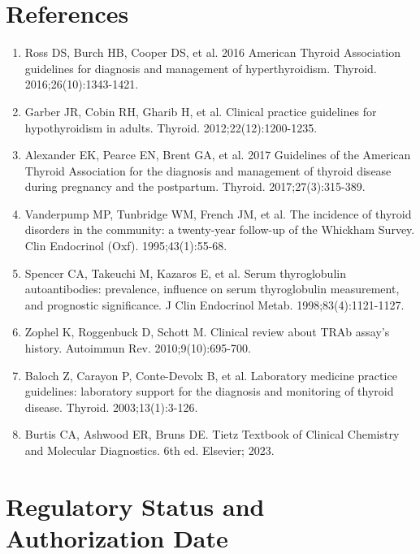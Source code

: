 \section*{References}
\begin{enumerate}
  \item Ross DS, Burch HB, Cooper DS, et al. 2016 American Thyroid Association guidelines for diagnosis and management of hyperthyroidism. Thyroid. 2016;26(10):1343-1421.
  \item Garber JR, Cobin RH, Gharib H, et al. Clinical practice guidelines for hypothyroidism in adults. Thyroid. 2012;22(12):1200-1235.
  \item Alexander EK, Pearce EN, Brent GA, et al. 2017 Guidelines of the American Thyroid Association for the diagnosis and management of thyroid disease during pregnancy and the postpartum. Thyroid. 2017;27(3):315-389.
  \item Vanderpump MP, Tunbridge WM, French JM, et al. The incidence of thyroid disorders in the community: a twenty-year follow-up of the Whickham Survey. Clin Endocrinol (Oxf). 1995;43(1):55-68.
  \item Spencer CA, Takeuchi M, Kazaros E, et al. Serum thyroglobulin autoantibodies: prevalence, influence on serum thyroglobulin measurement, and prognostic significance. J Clin Endocrinol Metab. 1998;83(4):1121-1127.
  \item Zophel K, Roggenbuck D, Schott M. Clinical review about TRAb assay's history. Autoimmun Rev. 2010;9(10):695-700.
  \item Baloch Z, Carayon P, Conte-Devolx B, et al. Laboratory medicine practice guidelines: laboratory support for the diagnosis and monitoring of thyroid disease. Thyroid. 2003;13(1):3-126.
  \item Burtis CA, Ashwood ER, Bruns DE. Tietz Textbook of Clinical Chemistry and Molecular Diagnostics. 6th ed. Elsevier; 2023.
\end{enumerate}

\clearpage
\section*{Regulatory Status and Authorization Date}

\clearpage
